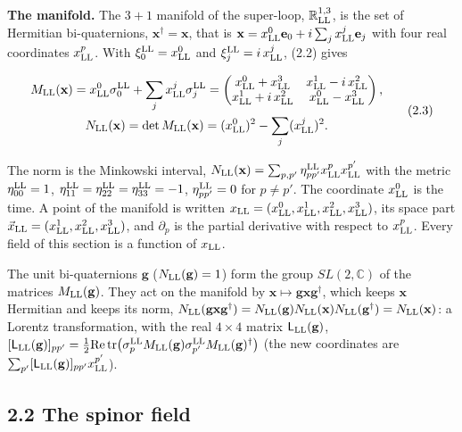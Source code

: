 \documentclass[
  10pt,
]{article}
\begin{document}
\textbf{The manifold.} The \(3+1\) manifold of the super-loop,
\(\mathbb R^{1,3}_{\rm LL}\), is the set of Hermitian bi-quaternions,
\(\mathbf x^\dagger=\mathbf x\), that is
\(\mathbf x=x^0_{\rm LL}\mathbf e_0+i\sum_jx^j_{\rm LL}\mathbf e_j\)
with four real coordinates \(x^p_{\rm LL}\). With
\(\xi^{\rm LL}_0=x^0_{\rm LL}\) and \(\xi^{\rm LL}_j=i\,x^j_{\rm LL}\),
(2.2) gives

\[\begin{gathered}M_{\rm LL}(\mathbf x)=x^0_{\rm LL}\sigma^{\rm LL}_0+\sum_jx^j_{\rm LL}\sigma^{\rm LL}_j=\begin{pmatrix}x^0_{\rm LL}+x^3_{\rm LL}&x^1_{\rm LL}-i\,x^2_{\rm LL}\\x^1_{\rm LL}+i\,x^2_{\rm LL}&x^0_{\rm LL}-x^3_{\rm LL}\end{pmatrix},\\ N_{\rm LL}(\mathbf x)=\det M_{\rm LL}(\mathbf x)=(x^0_{\rm LL})^2-\sum_j(x^j_{\rm LL})^2.\end{gathered}\tag{2.3}\]

The norm is the Minkowski interval,
\(N_{\rm LL}(\mathbf x)=\sum_{p,p'}\eta^{\rm LL}_{pp'}x^p_{\rm LL}x^{p'}_{\rm LL}\)
with the metric \(\eta^{\rm LL}_{00}=1\),
\(\eta^{\rm LL}_{11}=\eta^{\rm LL}_{22}=\eta^{\rm LL}_{33}=-1\),
\(\eta^{\rm LL}_{pp'}=0\) for \(p\neq p'\). The coordinate
\(x^0_{\rm LL}\) is the time. A point of the manifold is written
\(x_{\rm LL}=(x^0_{\rm LL},x^1_{\rm LL},x^2_{\rm LL},x^3_{\rm LL})\),
its space part
\(\vec x_{\rm LL}=(x^1_{\rm LL},x^2_{\rm LL},x^3_{\rm LL})\), and
\(\partial_p\) is the partial derivative with respect to
\(x^p_{\rm LL}\). Every field of this section is a function of
\(x_{\rm LL}\).

The unit bi-quaternions \(\mathbf g\) (\(N_{\rm LL}(\mathbf g)=1\)) form
the group \(SL(2,\mathbb C)\) of the matrices \(M_{\rm LL}(\mathbf g)\).
They act on the manifold by
\(\mathbf x\mapsto\mathbf g\mathbf x\mathbf g^\dagger\), which keeps
\(\mathbf x\) Hermitian and keeps its norm,
\(N_{\rm LL}(\mathbf g\mathbf x\mathbf g^\dagger)=N_{\rm LL}(\mathbf g)N_{\rm LL}(\mathbf x)N_{\rm LL}(\mathbf g^\dagger)=N_{\rm LL}(\mathbf x)\):
a Lorentz transformation, with the real \(4\times4\) matrix
\(\mathsf L_{\rm LL}(\mathbf g)\),
\([\mathsf L_{\rm LL}(\mathbf g)]_{pp'}=\tfrac12\mathrm{Re}\,\mathrm{tr}\big(\sigma^{\rm LL}_pM_{\rm LL}(\mathbf g)\sigma^{\rm LL}_{p'}M_{\rm LL}(\mathbf g)^\dagger\big)\)
(the new coordinates are
\(\sum_{p'}[\mathsf L_{\rm LL}(\mathbf g)]_{pp'}x^{p'}_{\rm LL}\)).

\hypertarget{the-spinor-field}{%
\subsection{2.2 The spinor field}\label{the-spinor-field}}
\end{document}
